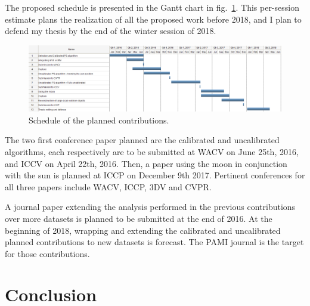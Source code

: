 \documentclass{report}
\begin{document}

The proposed schedule is presented in the Gantt chart in fig.~\ref{fig:schedule-gantt}. This per-session estimate plans the realization of all the proposed work before 2018, and I plan to defend my thesis by the end of the winter session of 2018.

\begin{figure}
\centering
\includegraphics[width=\linewidth]{schedule.png}
\caption{Schedule of the planned contributions.}
\label{fig:schedule-gantt}
\end{figure}

The two first conference paper planned are the calibrated and uncalibrated algorithms, each respectively are to be submitted at WACV on June 25th, 2016, and ICCV on April 22th, 2016. Then, a paper using the moon in conjunction with the sun is planned at ICCP on December 9th 2017. Pertinent conferences for all three papers include WACV, ICCP, 3DV and CVPR.

A journal paper extending the analysis performed in the previous contributions over more datasets is planned to be submitted at the end of 2016. At the beginning of 2018, wrapping and extending the calibrated and uncalibrated planned contributions to new datasets is forecast. The PAMI journal is the target for those contributions.


\chapter{Conclusion}\label{conclusion}
\end{document}
